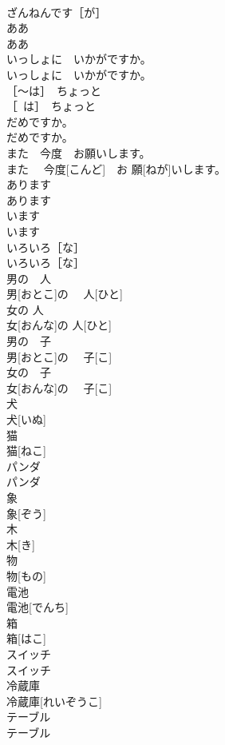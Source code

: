 \documentclass[8pt]{extreport}
\begin{document}
\begin{CJK}{UTF8}{min}
\\	ざんねんです［が］	
\\	ああ	
\\	ああ	
\\	いっしょに　いかがですか。	
\\	いっしょに　いかがですか。	
\\	［～は］　ちょっと	
\\	［~は］　ちょっと	
\\	だめですか。	
\\	だめですか。	
\\	また　今度　お願いします。	
\\	また　 今度[こんど]　お 願[ねが]いします。	
\\	あります	
\\	あります	
\\	います	
\\	います	
\\	いろいろ［な］	
\\	いろいろ［な］	
\\	男の　人	
\\	男[おとこ]の　 人[ひと]	
\\	女の 人	
\\	女[おんな]の 人[ひと]	
\\	男の　子	
\\	男[おとこ]の　 子[こ]	
\\	女の　子	
\\	女[おんな]の　 子[こ]	
\\	犬	
\\	犬[いぬ]	
\\	猫	
\\	猫[ねこ]	
\\	パンダ	
\\	パンダ	
\\	象	
\\	象[ぞう]	
\\	木	
\\	木[き]	
\\	物	
\\	物[もの]	
\\	電池	
\\	電池[でんち]	
\\	箱	
\\	箱[はこ]	
\\	スイッチ	
\\	スイッチ	
\\	冷蔵庫	
\\	冷蔵庫[れいぞうこ]	
\\	テーブル	
\\	テーブル	

\end{CJK}
\end{document}

